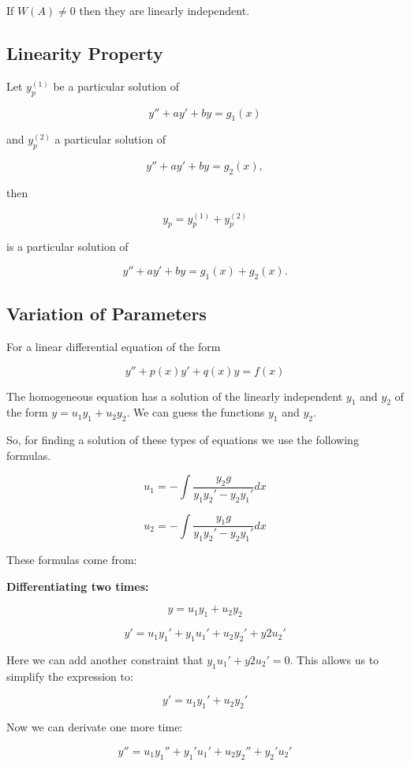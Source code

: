 If \(W(A) \ne 0\) then they are linearly independent.

\subsection{Linearity Property}

Let \( y_p^{(1)} \) be a particular solution of  

\[
    y'' + ay' + by = g_1(x)
\]  

and \( y_p^{(2)} \) a particular solution of  

\[
    y'' + ay' + by = g_2(x),
\]  

then  

\[
    y_p = y_p^{(1)} + y_p^{(2)}
\]  

is a particular solution of  

\[
    y'' + ay' + by = g_1(x) + g_2(x).
\]  

\subsection{Variation of Parameters}

For a linear differential equation of the form

\[
    y'' + p(x)y' + q(x)y = f(x)
\]

The homogeneous equation has a solution of the linearly independent \(y_1\) and \(y_2\)
of the form \(y = u_1 y_1 + u_2 y_2\). We can guess the functions \(y_1\) and \(y_2\).

So, for finding a solution of these types of equations we use the following formulas.

\[
    u_1 = - \int \frac{y_2 g}{y_1 y_{2}' - y_2 y_{1}'} dx
\]

\[
    u_2 = - \int \frac{y_1 g}{y_1 y_{2}' - y_2 y_{1}'} dx
\]

These formulas come from:

\textbf{Differentiating two times:}

\[
    y = u_1 y_1 + u_2 y_2
\]

\[
    y' = u_1 y_{1}' + y_1 u_{1}' +  u_2 y_{2}' + y{2} u_{2}'
\]

Here we can add another constraint that \(y_1 u_{1}' + y{2} u_{2}' = 0\). This allows us to
simplify the expression to:

\[
    y' = u_1 y_{1}' +  u_2 y_{2}'
\]

Now we can derivate one more time:

\[
    y'' =  u_1 y_{1}'' + y_{1}' u_{1}'  + u_2 y_{2}'' + y_{2}' u_{2}'
\]

